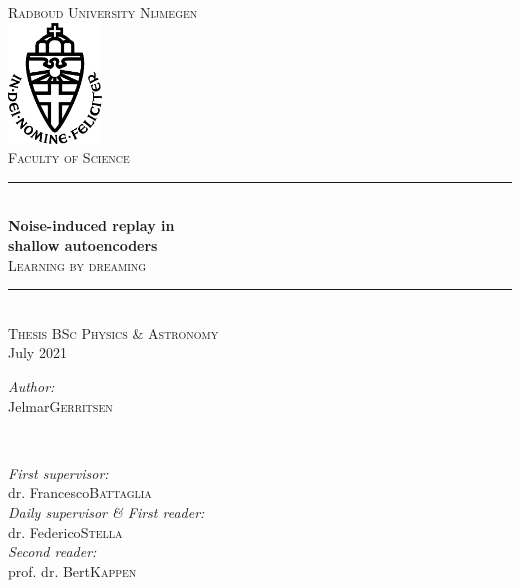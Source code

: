 \documentclass[11pt]{article}
\title{\thesistitle}
\author{\thesisauthorfirst\space\thesisauthorsecond}
\date{\thesisdate}
\def\thesistitle{Noise-induced replay in\\ shallow autoencoders}
\def\thesissubtitle{Learning by dreaming}
\def\thesisauthorfirst{Jelmar}
\def\thesisauthorsecond{Gerritsen}
\def\thesissupervisorfirst{dr. Francesco}
\def\thesissupervisorsecond{Battaglia}
\def\thesissupervisorreaderfirst{dr. Federico}
\def\thesissupervisorreadersecond{Stella}
\def\thesissecondreaderfirst{prof. dr. Bert}
\def\thesissecondreadersecond{Kappen}
\def\thesisdate{July 2021}
\theoremstyle{remark}
\begin{document}
\begin{titlepage}
  \thispagestyle{empty}
  \newcommand{\HRule}{\rule{\linewidth}{0.5mm}}
  \center
  \textsc{\Large Radboud University Nijmegen}\\[.7cm]
  \includegraphics[width=25mm]{in_dei_nomine_feliciter.eps}\\[.5cm]
  \textsc{Faculty of Science}\\[0.5cm]

  \HRule \\[0.4cm]
  { \huge \bfseries \thesistitle}\\[0.1cm]
  \textsc{\thesissubtitle}\\
  \HRule \\[.5cm]
  \textsc{\large Thesis BSc Physics \& Astronomy}\\[.5cm]
  {\large \thesisdate}\\[.5cm]

  \begin{minipage}{0.4\textwidth}
    \begin{flushleft} \large
      \emph{Author:}\\
      \thesisauthorfirst\space \textsc{\thesisauthorsecond}
    \end{flushleft}
  \end{minipage}
  ~
  \begin{minipage}{0.4\textwidth}
    \begin{flushright} \large
      \emph{First supervisor:} \\
      \thesissupervisorfirst\space \textsc{\thesissupervisorsecond} \\[1em]
      \emph{Daily supervisor \& First reader:} \\
      \thesissupervisorreaderfirst\space \textsc{\thesissupervisorreadersecond} \\[1em]
      \emph{Second reader:} \\
      \thesissecondreaderfirst\space \textsc{\thesissecondreadersecond}
    \end{flushright}
  \end{minipage}\\[4cm]
  \vfill
  \clearpage
\end{titlepage}
\end{document}
